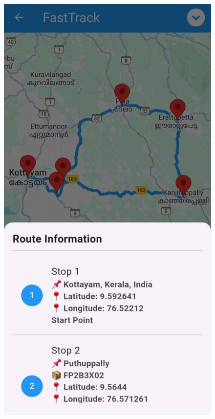 \begin{figure}[H]
\centering
\begin{minipage}{0.24\textwidth}
    \centering
    \includegraphics[width=\linewidth]{4/Route_Optimization2.jpg}
    \label{fig:route_optimization2}
\end{minipage}%

\end{figure}
